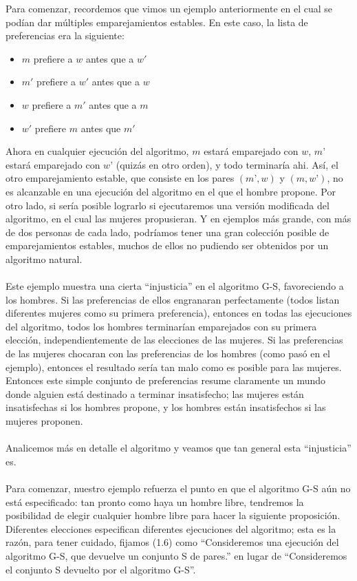 \documentclass[a4paper]{article}
\begin{document}
Para comenzar, recordemos que vimos un ejemplo anteriormente en el cual se podían dar múltiples emparejamientos estables. En este caso, la lista de preferencias era la siguiente:	
\begin{itemize}
  \item $m$ prefiere a $w$ antes que a $w'$
  \item $m'$ prefiere a $w'$ antes que a $w$
  \item $w$ prefiere a $m'$ antes que a $m$
  \item $w'$ prefiere $m$ antes que $m'$
\end{itemize}
Ahora en cualquier ejecución del algoritmo, $m$ estará emparejado con $w$, $m’$ estará emparejado con $w’$ (quizás en otro orden), y todo terminaría ahi. Así, el otro emparejamiento estable, que consiste en los pares $(m’,w)$ y $(m,w’)$, no es alcanzable en una ejecución del algoritmo en el que el hombre propone. Por otro lado, si sería posible lograrlo si ejecutaremos una versión modificada del algoritmo, en el cual las mujeres propusieran. Y en ejemplos más grande, con más de dos personas de cada lado, podríamos tener una gran colección posible de emparejamientos estables, muchos de ellos no pudiendo ser obtenidos por un algoritmo natural.
\\
\\
Este ejemplo muestra una cierta “injusticia” en el algoritmo G-S, favoreciendo a los hombres. Si las preferencias de ellos engranaran perfectamente (todos listan diferentes mujeres como su primera preferencia), entonces en todas las ejecuciones del algoritmo, todos los hombres terminarían emparejados con su primera elección, independientemente de las elecciones de las mujeres. Si las preferencias de las mujeres chocaran con las preferencias de los hombres (como pasó en el ejemplo), entonces el resultado sería tan malo como es posible para las mujeres. Entonces este simple conjunto de preferencias resume claramente un mundo donde alguien está destinado a terminar insatisfecho; las mujeres están insatisfechas si los hombres propone, y los hombres están insatisfechos si las mujeres proponen.
\\
\\
Analicemos más en detalle el algoritmo y veamos que tan general esta “injusticia” es.
\\
\\
Para comenzar, nuestro ejemplo refuerza el punto en que el algoritmo G-S aún no está especificado: tan pronto como haya un hombre libre, tendremos la posibilidad de elegir cualquier hombre libre para hacer la siguiente proposición. Diferentes elecciones especifican diferentes ejecuciones del algoritmo; esta es la razón, para tener cuidado, fijamos (1.6) como “Consideremos una ejecución del algoritmo G-S, que devuelve un conjunto S de pares.” en lugar de “Consideremos el conjunto S devuelto por el algoritmo G-S”.
\end{document}
